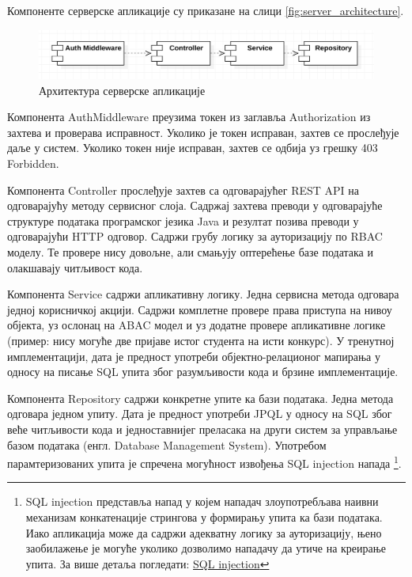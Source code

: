 \documentclass[a4paper]{article}
\begin{document}
Компоненте серверске апликације су приказане на слици \autoref{fig:server_architecture}.

\begin{figure}[H]
    \centering
    \includegraphics{images/server_architecture.png}
    \caption{Архитектура серверске апликације}
    \label{fig:server_architecture}
\end{figure}

Компонента AuthMiddleware преузима токен из заглавља Authorization из захтева и проверава исправност. Уколико је токен 
исправан, захтев се прослеђује даље у систем. Уколико токен није исправан, захтев се одбија уз грешку 403 Forbidden.

Компонента Controller прослеђује захтев са одговарајућег REST API на одговарајућу методу сервисног слоја. Садржај
захтева преводи у одговарајуће структуре података програмског језика Java и резултат позива преводи у одговарајући HTTP одговор. Садржи грубу логику за ауторизацију по RBAC\cite{rbac} моделу. Те провере нису довољне, али смањују оптерећење базе података и олакшавају читљивост кода.

Компонента Service садржи апликативну логику. Једна сервисна метода одговара једној корисничкој акцији. Садржи комплетне
провере права приступа на нивоу објекта, уз ослонац на ABAC\cite{abac} модел и уз додатне провере апликативне логике
(пример: нису могуће две пријаве истог студента на исти конкурс). У тренутној имплементацији, дата је предност употреби
објектно-релационог мапирања у односу на писање SQL упита због разумљивости кода и брзине имплементације.

Компонента Repository садржи конкретне упите ка бази података. Једна метода одговара једном упиту. Дата је предност
употреби JPQL у односу на SQL због веће читљивости кода и једноставнијег преласака на други систем за управљање базом података (енгл. Database Management System). Употребом парамтеризованих упита је спречена могућност извођења SQL injection напада
\footnote{SQL injection представља напад у којем нападач злоупотребљава наивни механизам конкатенације стрингова у формирању упита ка бази података.
Иако апликација може да садржи адекватну логику за ауторизацију, њено заобилажење је могуће уколико дозволимо нападачу да утиче на креирање упита.
За више детаља погледати: \href{https://portswigger.net/web-security/sql-injection}{SQL injection}}.
\end{document}

